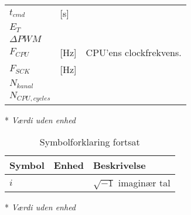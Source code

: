 \begin{table}[h!]
\begin{threeparttable}
\begin{tabular}{l l l}
$t_{cmd}$ & [\si{\second}] & \\
$E_T$ & & \\
$\Delta PWM$ & & \\
$F_{CPU}$ & [\si{\hertz}] & CPU'ens clockfrekvens. \\
$F_{SCK}$ & [\si{\hertz}] & \\
$N_{kanal}$ & & \\
$N_{CPU,cycles}$ & & \\
\bottomrule
\end{tabular}
\begin{tablenotes}
\item[*] \textit{Værdi uden enhed}
\end{tablenotes}
\end{threeparttable}
\end{table}




\begin{table}[h!]
\centering
\caption{Symbolforklaring fortsat}
\label{tab:symboler2}
\begin{threeparttable}
\begin{tabular}{l l l}
\toprule
\multicolumn{1}{l}{Symbol}       &
\multicolumn{1}{l}{Enhed}        &
\multicolumn{1}{l}{Beskrivelse}  \\ 
\midrule
$i$\tnote{*}		&								& $\sqrt{-1}$ imaginær tal	\\
\bottomrule
\end{tabular}
\begin{tablenotes}
\item[*] \textit{Værdi uden enhed}
\end{tablenotes}
\end{threeparttable}
\end{table}


